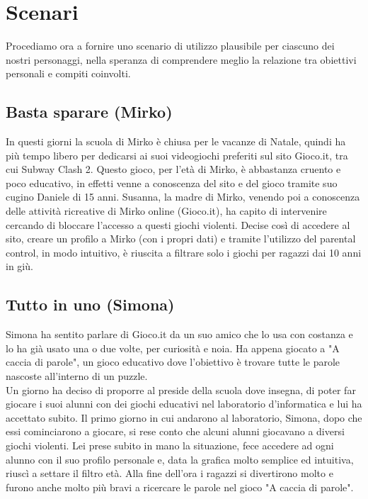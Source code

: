 \documentclass[../Report.tex]{subfiles}
\begin{document}
    \section{Scenari}
    Procediamo ora a fornire uno scenario di utilizzo plausibile per ciascuno dei nostri personaggi, nella speranza di comprendere meglio la relazione tra obiettivi personali e compiti coinvolti.

    \subsection{Basta sparare (Mirko)}
    In questi giorni la scuola di Mirko è chiusa per le vacanze di Natale, quindi ha più tempo libero per dedicarsi ai suoi videogiochi preferiti sul sito Gioco.it, tra cui Subway Clash 2. Questo gioco, per l'età di Mirko, è abbastanza cruento e poco educativo, in effetti venne a conoscenza del sito e del gioco tramite suo cugino Daniele di 15 anni. Susanna, la madre di Mirko, venendo poi a conoscenza delle attività ricreative di Mirko online (Gioco.it), ha capito di intervenire cercando di bloccare l'accesso a questi giochi violenti. Decise così di accedere al sito, creare un profilo a Mirko (con i propri dati) e tramite l'utilizzo del parental control, in modo intuitivo, è riuscita a filtrare solo i giochi per ragazzi dai 10 anni in giù.

    \subsection{Tutto in uno (Simona)}
    Simona ha sentito parlare di Gioco.it da un suo amico che lo usa con costanza e lo ha già usato una o due volte, per curiosità e noia. Ha appena giocato a "A caccia di parole", un gioco educativo dove l'obiettivo è trovare tutte le parole nascoste all'interno di un puzzle.\\
    Un giorno ha deciso di proporre al preside della scuola dove insegna, di poter far giocare i suoi alunni con dei giochi educativi nel laboratorio d'informatica e lui ha accettato subito. Il primo giorno in cui andarono al laboratorio, Simona, dopo che essi cominciarono a giocare, si rese conto che alcuni alunni giocavano a diversi giochi violenti. Lei prese subito in mano la situazione, fece accedere ad ogni alunno con il suo profilo personale e, data la grafica molto semplice ed intuitiva, riuscì a settare il filtro età. Alla fine dell'ora i ragazzi si divertirono molto e furono anche molto più bravi a ricercare le parole nel gioco "A caccia di parole".
\end{document}

